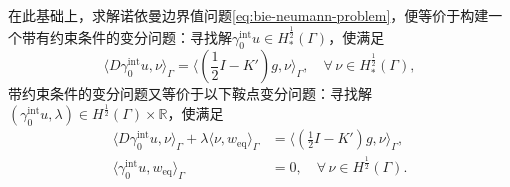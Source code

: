 在此基础上，求解诺依曼边界值问题\eqref{eq:bie-neumann-problem}，便等价于构建一个带有约束条件的变分问题：寻找解$\gamma_{0}^{\text{int}} u \in H_{*}^{\frac{1}{2}}(\Gamma)$，使满足
\begin{equation}
  \label{eq:bie-neumann-var-problem-constrain}
  \langle D \gamma_{0}^{\text{int}} u, \nu \rangle_{\Gamma}
  = \langle \left( \frac{1}{2} I - K' \right) g, \nu \rangle_{\Gamma}, \quad \forall \, \nu \in H_{*}^{\frac{1}{2}}(\Gamma),
\end{equation}
带约束条件的变分问题又等价于以下鞍点变分问题：寻找解$\left( \gamma_{0}^{\text{int}} u, \lambda \right) \in H^{\frac{1}{2}}(\Gamma) \times \mathbb{R}$，使满足
\begin{equation}
  \label{eq:bie-neumann-var-problem-saddle}
  \begin{split}
    \langle D \gamma_{0}^{\text{int}} u, \nu \rangle_{\Gamma}
    + \lambda \langle \nu, w_{\text{eq}} \rangle_{\Gamma}
    &= \langle \left( \frac{1}{2} I - K' \right) g, \nu \rangle_{\Gamma},\\
    \langle \gamma_{0}^{\text{int}} u, w_{\text{eq}} \rangle_{\Gamma} &=0, \quad \forall \, \nu \in H^{\frac{1}{2}}(\Gamma).
  \end{split}
\end{equation}

